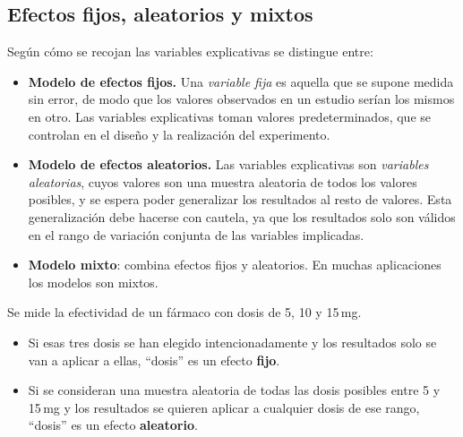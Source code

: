 \subsection{Efectos fijos, aleatorios y mixtos}

Según cómo se recojan las variables explicativas se distingue entre:

\begin{definicion}
  \begin{itemize}
    \item \textbf{Modelo de efectos fijos.} Una \emph{variable fija} es aquella que se supone
      medida sin error, de modo que los valores observados en un estudio serían los mismos en
      otro. Las variables explicativas toman valores predeterminados, que se controlan en el
      diseño y la realización del experimento.
    \item \textbf{Modelo de efectos aleatorios.} Las variables explicativas son \emph{variables
      aleatorias}, cuyos valores son una muestra aleatoria de todos los valores posibles, y se
      espera poder generalizar los resultados al resto de valores. Esta generalización debe
      hacerse con cautela, ya que los resultados solo son válidos en el rango de variación
      conjunta de las variables implicadas.
    \item \textbf{Modelo mixto}: combina efectos fijos y aleatorios. En muchas aplicaciones los
      modelos son mixtos.
  \end{itemize}
\end{definicion}

\begin{ejemplo}
  Se mide la efectividad de un fármaco con dosis de 5, 10 y 15\,mg.
  \begin{itemize}
    \item Si esas tres dosis se han elegido intencionadamente y los resultados solo se van a
      aplicar a ellas, ``dosis'' es un efecto \textbf{fijo}.
    \item Si se consideran una muestra aleatoria de todas las dosis posibles entre 5 y 15\,mg
      y los resultados se quieren aplicar a cualquier dosis de ese rango, ``dosis'' es un
      efecto \textbf{aleatorio}.
  \end{itemize}
\end{ejemplo}
